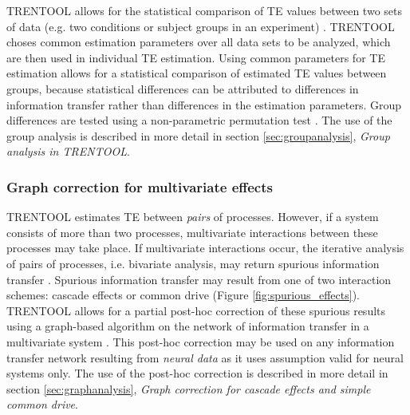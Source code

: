 \documentclass[a4paper,10pt]{article}
\begin{document}
TRENTOOL allows for the statistical comparison of TE values between two sets of data (e.g. two conditions or subject groups in an experiment) \cite{lindner2011}. TRENTOOL choses common estimation parameters over all data sets to be analyzed, which are then used in individual TE estimation. Using common parameters for TE estimation allows for a statistical comparison of estimated TE values between groups, because statistical differences can be attributed to differences in information transfer rather than differences in the estimation parameters. Group differences are tested using a non-parametric permutation test \cite{maris2007,lindner2011}. The use of the group analysis is described in more detail in section \ref{sec:groupanalysis}, \textit{Group analysis in TRENTOOL}.

\subsubsection{Graph correction for multivariate effects}

TRENTOOL estimates TE between \textit{pairs} of processes. However, if a system consists of more than two processes, multivariate interactions between these processes may take place. If multivariate interactions occur, the iterative analysis of pairs of processes, i.e. bivariate analysis, may return spurious information transfer \cite{kaminski2001,blinowska2004,lizier2013}. Spurious information transfer may result from one of two interaction schemes: cascade effects or common drive (Figure \ref{fig:spurious_effects}). TRENTOOL allows for a partial post-hoc correction of these spurious results using a graph-based algorithm on the network of information transfer in a multivariate system \cite{wibralIEEE}. This post-hoc correction may be used on any information transfer network resulting from \textit{neural data} as it uses assumption valid for neural systems only. The use of the post-hoc correction is described in more detail in section \ref{sec:graphanalysis}, \textit{Graph correction for cascade effects and 
simple common drive}.
\end{document}
